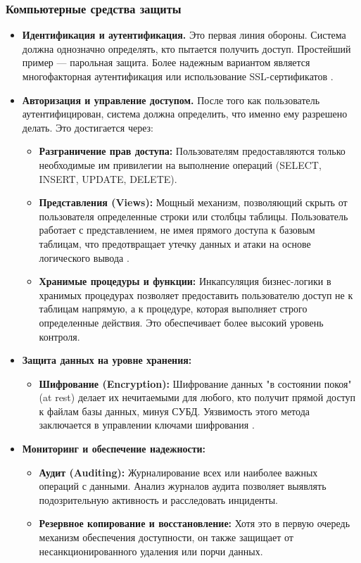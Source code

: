 \subsubsection{Компьютерные средства защиты}
\begin{itemize}
	\item \textbf{Идентификация и аутентификация.} Это первая линия обороны. Система должна однозначно определять, кто пытается получить доступ. Простейший пример — парольная защита. Более надежным вариантом является многофакторная аутентификация или использование SSL-сертификатов \autocite{MicrosoftLearnSQLserverPerm}.

	\item \textbf{Авторизация и управление доступом.} После того как пользователь аутентифицирован, система должна определить, что именно ему разрешено делать. Это достигается через:
	\begin{itemize}
		\item \textbf{Разграничение прав доступа:} Пользователям предоставляются только необходимые им привилегии на выполнение операций (SELECT, INSERT, UPDATE, DELETE).
		\item \textbf{Представления (Views):} Мощный механизм, позволяющий скрыть от пользователя определенные строки или столбцы таблицы. Пользователь работает с представлением, не имея прямого доступа к базовым таблицам, что предотвращает утечку данных и атаки на основе логического вывода \autocite[с. 12]{Skakun}.
		\item \textbf{Хранимые процедуры и функции:} Инкапсуляция бизнес-логики в хранимых процедурах позволяет предоставить пользователю доступ не к таблицам напрямую, а к процедуре, которая выполняет строго определенные действия. Это обеспечивает более высокий уровень контроля.
	\end{itemize}

	\item \textbf{Защита данных на уровне хранения:}
	\begin{itemize}
		\item \textbf{Шифрование (Encryption):} Шифрование данных "в состоянии покоя" (at rest) делает их нечитаемыми для любого, кто получит прямой доступ к файлам базы данных, минуя СУБД. Уязвимость этого метода заключается в управлении ключами шифрования \autocite{oracledbdoc3}.
	\end{itemize}
	
	\item \textbf{Мониторинг и обеспечение надежности:}
	\begin{itemize}
		\item \textbf{Аудит (Auditing):} Журналирование всех или наиболее важных операций с данными. Анализ журналов аудита позволяет выявлять подозрительную активность и расследовать инциденты.
		\item \textbf{Резервное копирование и восстановление:} Хотя это в первую очередь механизм обеспечения доступности, он также защищает от несанкционированного удаления или порчи данных.
	\end{itemize}
\end{itemize}

